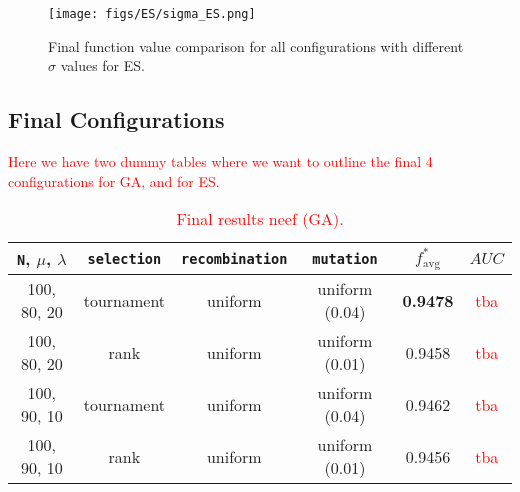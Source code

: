 \documentclass{article}
\newcommand{\todo}[1]{\textcolor{red}{#1}}
\begin{document}
\begin{figure*}[htbp]
    \centering
    \texttt{[image: figs/ES/sigma\_ES.png]}
    \captionsetup{width=.55\textwidth}
    \caption{
        Final function value comparison for all configurations with different $\sigma$ values for ES.
    }
    \label{fig:sigma_ES}
\end{figure*}

\newpage

\subsection*{Final Configurations}
\label{subsec:final_configs}

\todo{Here we have two dummy tables where we want to outline the final 4 configurations for GA, and for ES.}



\begin{table}[htbp]
    \centering
    \begin{tabular}{cccc|cc}
        \toprule
        \texttt{N}, $\mu$, $\lambda$ & \texttt{selection} & \texttt{recombination} & \texttt{mutation}
            & $f^*_{\mathrm{avg}} $ & $AUC$ \\ %
        \midrule
        100, 80, 20  &  tournament  &  uniform   &  uniform (0.04)  &  \textbf{0.9478}  &  \todo{tba}  \\
        100, 80, 20  &  rank        &  uniform   &  uniform (0.01)  &  0.9458           &  \todo{tba}  \\
        100, 90, 10  &  tournament  &  uniform   &  uniform (0.04)  &  0.9462           &  \todo{tba}  \\
        100, 90, 10  &  rank        &  uniform   &  uniform (0.01)  &  0.9456           &  \todo{tba}  \\
        \bottomrule
    \end{tabular}
    \vspace{0.1cm}
    \caption{\todo{Final results neef (GA).}}
    \label{tab:GA_final_configs}
\end{table}
\end{document}
